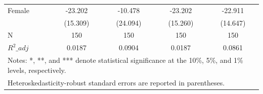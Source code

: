 \begin{table}[htbp]
\begin{tabular}{l*{4}{c}}
\addlinespace
Female              &     -23.202         &     -10.478         &     -23.202         &     -22.911         \\
                    &    (15.309)         &    (24.094)         &    (15.260)         &    (14.647)         \\
\midrule
N                   &         150         &         150         &         150         &         150         \\
\(R^2\_{adj}\)       &      0.0187         &      0.0904         &      0.0187         &      0.0861         \\
\bottomrule
\multicolumn{5}{l}{\footnotesize Notes: *, **, and *** denote statistical significance at the 10\%, 5\%, and 1\% levels, respectively.}\\
\multicolumn{5}{l}{\footnotesize Heteroskedasticity-robust standard errors are reported in parentheses.}\\
\end{tabular}
\end{table}
